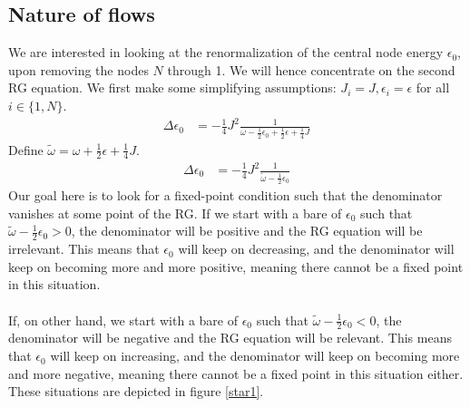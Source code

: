 \documentclass[twoside]{report}
\numberwithin{equation}{section}
\begin{document}
\subsection{Nature of flows}
We are interested in looking at the renormalization of the central node energy \(\epsilon_0\), upon removing the nodes \(N\) through 1. We will hence concentrate on the second RG equation. We first make some simplifying assumptions: \(J_i = J, \epsilon_i = \epsilon\) for all \(i\in\{1,N\}\).
\begin{equation}\begin{aligned}
	\label{stareq}
	\Delta \epsilon_0 &= -\frac{1}{4}J^2 \frac{1}{\omega - \frac{1}{2}\epsilon_0 + \frac{1}{2}\epsilon + \frac{1}{4}J}
\end{aligned}\end{equation}
Define \(\tilde\omega = \omega + \frac{1}{2}\epsilon + \frac{1}{4}J\).
\begin{equation}\begin{aligned}
	\Delta \epsilon_0 &= -\frac{1}{4}J^2 \frac{1}{\tilde \omega - \frac{1}{2}\epsilon_0}
\end{aligned}\end{equation}
Our goal here is to look for a fixed-point condition such that the denominator vanishes at some point of the RG. If we start with a bare of \(\epsilon_0\) such that \(\tilde \omega - \frac{1}{2}\epsilon_0 > 0\), the denominator will be positive and the RG equation will be irrelevant. This means that \(\epsilon_0\) will keep on decreasing, and the denominator will keep on becoming more and more positive, meaning there cannot be a fixed point in this situation.
\\\\If, on other hand, we start with a bare of \(\epsilon_0\) such that \(\tilde \omega - \frac{1}{2}\epsilon_0 < 0\), the denominator will be negative and the RG equation will be relevant. This means that \(\epsilon_0\) will keep on increasing, and the denominator will keep on becoming more and more negative, meaning there cannot be a fixed point in this situation either. These situations are depicted in figure \ref{star1}.
\end{document}
